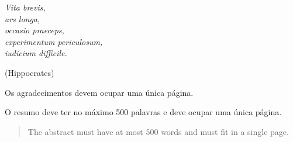 \documentclass[Portugues,Final]{tese-FT}
\begin{document}
        
        
        \paginasiniciais
        
         \begin{epigrafe}
        {\it
        Vita brevis,\\
        ars longa,\\
        occasio praeceps,\\
        experimentum periculosum,\\
        iudicium difficile.}
        
        \hfill (Hippocrates)
        \end{epigrafe}
        Os agradecimentos devem ocupar uma única página.
        
        \begin{resumo}
        O resumo deve ter no máximo 500 palavras e deve ocupar uma única página.
        \end{resumo}
        
        
        \begin{abstract}
        The abstract must have at most 500 words and must fit in a single page.
        \end{abstract}
        
        
        \listoffigures
        
        \listoftables
        
        
\end{document}
